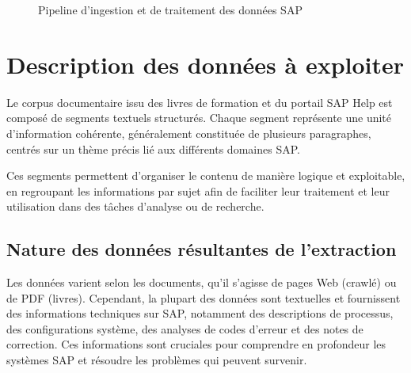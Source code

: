 \begin{figure}[H]
{
}
\caption{Pipeline d’ingestion et de traitement des données SAP}
\label{fig:data_pipeline}
\end{figure}
\section{Description des données à exploiter }
Le corpus documentaire issu des livres de formation et du portail SAP Help est composé de segments textuels structurés. Chaque segment représente une unité d’information cohérente, généralement constituée de plusieurs paragraphes, centrés sur un thème précis lié aux différents domaines SAP.

Ces segments permettent d’organiser le contenu de manière logique et exploitable, en regroupant les informations par sujet afin de faciliter leur traitement et leur utilisation dans des tâches d’analyse ou de recherche.
\setcounter{secnumdepth}{3}
\subsection{Nature des données résultantes de l’extraction}
Les données varient selon les documents, qu'il s'agisse de pages Web (crawlé) ou de PDF (livres). Cependant, la plupart des données sont textuelles et fournissent des informations techniques sur SAP, notamment des descriptions de processus, des configurations système, des analyses de codes d'erreur et des notes de correction. Ces informations sont cruciales pour comprendre en profondeur les systèmes SAP et résoudre les problèmes qui peuvent survenir.



